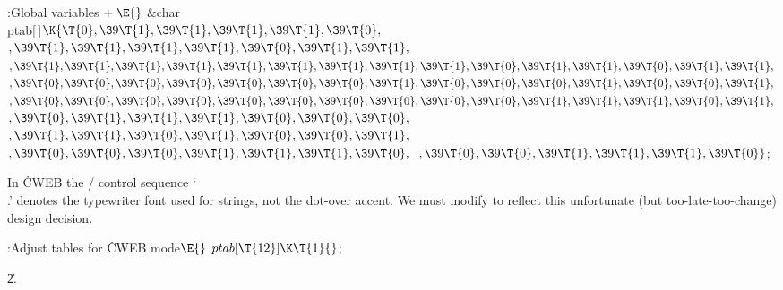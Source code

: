 \Y\B\4:Global variables\X${}\mathrel+\E{}$\6
\&{char} \\{ptab}[\,]${}\K\{\T{0},\39\T{1},\39\T{1},\39\T{1},\39\T{1},\39%
\T{0},{}$\6
${},\39\T{1},\39\T{1},\39\T{1},\39\T{1},\39\T{0},\39\T{1},\39\T{1},{}$\C{ %
\.{\\-} }\6
${},\39\T{1},\39\T{1},\39\T{1},\39\T{1},\39\T{1},\39\T{1},\39\T{1},\39%
\T{1},\39\T{1},\39\T{0},\39\T{1},\39\T{1},\39\T{0},\39\T{1},\39\T{1},{}$\6
${},\39\T{0},\39\T{0},\39\T{0},\39\T{0},\39\T{0},\39\T{0},\39\T{0},\39%
\T{1},\39\T{0},\39\T{0},\39\T{0},\39\T{1},\39\T{0},\39\T{0},\39\T{1},{}$\C{ \.{%
\\H}, \.{\\L}, \.{\\O} }\6
${},\39\T{0},\39\T{0},\39\T{0},\39\T{0},\39\T{0},\39\T{0},\39\T{0},\39%
\T{0},\39\T{0},\39\T{0},\39\T{1},\39\T{1},\39\T{1},\39\T{0},\39\T{1},{}$\C{ \.{%
\\\^} }\6
${},\39\T{0},\39\T{1},\39\T{1},\39\T{1},\39\T{0},\39\T{0},\39\T{0},{}$\6
${},\39\T{1},\39\T{1},\39\T{0},\39\T{1},\39\T{0},\39\T{0},\39\T{1},{}$\C{ %
\.{\\i}, \.{\\j}, \.{\\l}, \.{\\o} }\6
${},\39\T{0},\39\T{0},\39\T{0},\39\T{1},\39\T{1},\39\T{1},\39\T{0},{}$\C{ %
\.{\\t}, \.{\\u}, \.{\\v} }\6
${},\39\T{0},\39\T{0},\39\T{1},\39\T{1},\39\T{1},\39\T{0}\}{}$;\C{ \.{%
\\\~} }\par
\fi

In \.{CWEB} the \TEX/ control sequence `\.{\\.}' denotes the typewriter
font used for strings, not the dot-over accent. We must modify
 to reflect this unfortunate (but too-late-too-change) design
decision.

\Y\B\4:Adjust tables for \.{CWEB} mode\X${}\E{}$\6
$\\{ptab}[\T{12}]\K\T{1}{}$;\par
\U2.\fi

